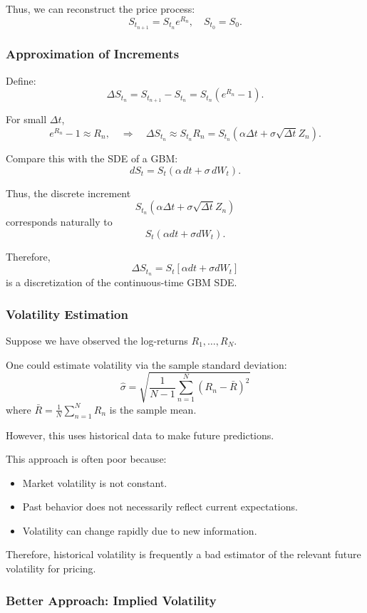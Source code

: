 \documentclass[12pt,a4paper]{article}
\theoremstyle{definition}
\begin{document}
Thus, we can reconstruct the price process:
\[
S_{t_{n+1}} = S_{t_n} e^{R_n}, \quad S_{t_0} = S_0.
\]

\subsubsection{Approximation of Increments}

Define:
\[
\Delta S_{t_n} = S_{t_{n+1}} - S_{t_n} = S_{t_n} (e^{R_n} - 1).
\]

For small $\Delta t$,
\[
e^{R_n} - 1 \approx R_n, \quad \Rightarrow \quad \Delta S_{t_n} \approx S_{t_n} R_n = S_{t_n} (\alpha \Delta t + \sigma \sqrt{\Delta t} Z_n).
\]

Compare this with the SDE of a GBM:
\[
dS_t = S_t (\alpha \, dt + \sigma \, dW_t).
\]

Thus, the discrete increment
\[
S_{t_n} (\alpha \Delta t + \sigma \sqrt{\Delta t} Z_n)
\]
corresponds naturally to
\[
S_t (\alpha dt + \sigma dW_t).
\]

Therefore,
\[
\Delta S_{t_n} = S_t [\alpha dt + \sigma dW_t]
\]
is a discretization of the continuous-time GBM SDE.

\subsubsection{Volatility Estimation}

Suppose we have observed the log-returns $R_1, \ldots, R_N$.

One could estimate volatility via the sample standard deviation:
\[
\hat{\sigma} = \sqrt{\frac{1}{N-1} \sum_{n=1}^N (R_n - \bar{R})^2}
\]
where $\bar{R} = \frac{1}{N} \sum_{n=1}^N R_n$ is the sample mean.

However, this uses historical data to make future predictions.

This approach is often poor because:
\begin{itemize}
\item Market volatility is not constant.
\item Past behavior does not necessarily reflect current expectations.
\item Volatility can change rapidly due to new information.
\end{itemize}

Therefore, historical volatility is frequently a bad estimator of the relevant future volatility for pricing.

\subsubsection{Better Approach: Implied Volatility}
\end{document}

